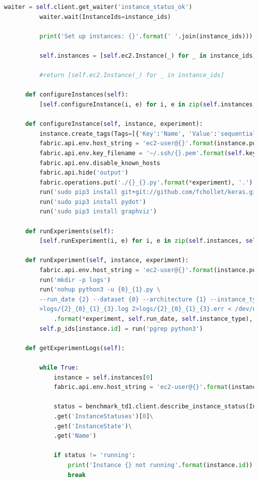 \documentclass[12pt,a4paper,twoside]{article}
\begin{document}
\begin{appendices}
\begin{lstlisting}[language=python]
          waiter = self.client.get_waiter('instance_status_ok')
          waiter.wait(InstanceIds=instance_ids)

          print('Set up instances: {}'.format(' '.join(instance_ids)))

          self.instances = [self.ec2.Instance(_) for _ in instance_ids]

          #return [self.ec2.Instance(_) for _ in instance_ids]

      def configureInstances(self):
          [self.configureInstance(i, e) for i, e in zip(self.instances, self.experiments)]

      def configureInstance(self, instance, experiment):
          instance.create_tags(Tags=[{'Key':'Name', 'Value':'sequential experiment'}])
          fabric.api.env.host_string = 'ec2-user@{}'.format(instance.public_dns_name)
          fabric.api.env.key_filename = '~/.ssh/{}.pem'.format(self.key_name)
          fabric.api.env.disable_known_hosts
          fabric.api.hide('output')
          fabric.operations.put('./{}_{}.py'.format(*experiment), '.')
          run('sudo pip3 install git+git://github.com/fchollet/keras.git --upgrade')
          run('sudo pip3 install pydot')
          run('sudo pip3 install graphviz')

      def runExperiments(self):
          [self.runExperiment(i, e) for i, e in zip(self.instances, self.experiments)]

      def runExperiment(self, instance, experiment):
          fabric.api.env.host_string = 'ec2-user@{}'.format(instance.public_dns_name)
          run('mkdir -p logs')
          run('nohup python3 -u {0}_{1}.py \
          --run_date {2} --dataset {0} --architecture {1} --instance_type {3} \
          >logs/{2}_{0}_{1}_{3}.log 2>logs/{2}_{0}_{1}_{3}.err < /dev/null &'
              .format(*experiment, self.run_date, self.instance_type), pty=False)
          self.p_ids[instance.id] = run('pgrep python3')

      def getExperimentLogs(self):

          while True:
              instance = self.instances[0]
              fabric.api.env.host_string = 'ec2-user@{}'.format(instance.public_dns_name)

              status = benchmark_td1.client.describe_instance_status(InstanceIds=[instance.id])\
              .get('InstanceStatuses')[0]\
              .get('InstanceState')\
              .get('Name')

              if status != 'running':
                  print('Instance {} not running'.format(instance.id))
                  break


\end{lstlisting}
\end{appendices}
\end{document}
